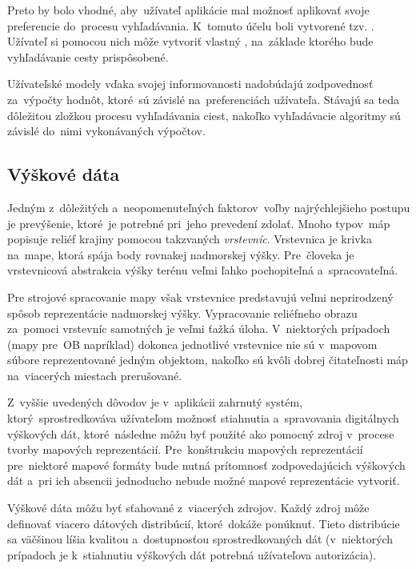 Preto by bolo vhodné, aby~užívateľ aplikácie mal možnosť aplikovať svoje preferencie do~procesu vyhľadávania. K~tomuto účelu boli vytvorené tzv. . Užívateľ si pomocou nich môže vytvoriť vlastný , na~základe ktorého bude vyhľadávanie cesty prispôsobené.

Užívateľské modely vďaka svojej informovanosti nadobúdajú zodpovednosť za~výpočty hodnôt, ktoré~sú závislé na~preferenciách užívateľa. Stávajú sa teda dôležitou zložkou procesu vyhľadávania ciest, nakoľko vyhľadávacie algoritmy sú závislé do~nimi vykonávaných výpočtov.

\subsection{Výškové dáta}\label{vyskove_data}

Jedným z~dôležitých a~neopomenuteľných faktorov~voľby najrýchlejšieho postupu je prevýšenie, ktoré~je potrebné pri~jeho prevedení zdolať. Mnoho typov~máp popisuje reliéf krajiny pomocou takzvaných \textit{vrstevníc}. Vrstevnica je krivka na~mape, ktorá spája body rovnakej nadmorskej výšky. Pre~človeka je vrstevnicová abstrakcia výšky terénu veľmi ľahko pochopiteľná a~spracovateľná.

Pre strojové spracovanie mapy však vrstevnice predstavujú veľmi neprirodzený spôsob reprezentácie nadmorskej výšky. Vypracovanie reliéfneho obrazu za~pomoci vrstevníc samotných je veľmi ťažká úloha. V~niektorých prípadoch (mapy pre~OB napríklad) dokonca jednotlivé vrstevnice nie sú v~mapovom súbore reprezentované jedným objektom, nakoľko sú kvôli dobrej čitateľnosti máp na~viacerých miestach prerušované.

Z~vyššie uvedených dôvodov je v~aplikácii zahrnutý systém, ktorý~sprostredkováva užívateľom možnosť stiahnutia a~spravovania digitálnych výškových dát, ktoré~následne môžu byť použité ako pomocný zdroj v~procese tvorby mapových reprezentácií. Pre~konštrukciu mapových reprezentácií pre~niektoré mapové formáty bude nutná prítomnosť zodpovedajúcich výškových dát a~pri ich absencii jednoducho nebude možné mapové reprezentácie vytvoriť.

Výškové dáta môžu byť sťahované z~viacerých zdrojov. Každý zdroj môže definovať viacero dátových distribúcií, ktoré~dokáže ponúknuť. Tieto distribúcie sa väčšinou líšia kvalitou a~dostupnosťou sprostredkovaných dát (v~niektorých prípadoch je k~stiahnutiu výškových dát potrebná užívateľova autorizácia).

